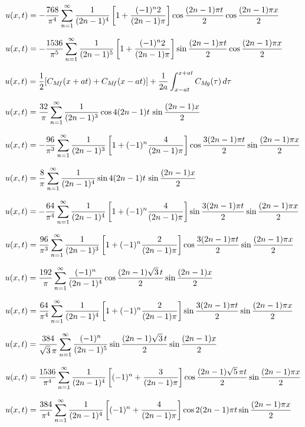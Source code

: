 $u(x,t)=-\displaystyle\frac{768}{\pi^{4}}\sum_{n=1}^{\infty}\frac{1}{(2n-1)^{4}}\left[
1+\frac{(-1)^{n}2}{(2n-1)\pi}\right]\cos\frac{(2n-1)\pi t}{2}\cos\frac{(2n-1)\pi
x}{2}$

$u(x,t)=-\displaystyle\frac{1536}{\pi^{5}}\sum_{n=1}^{\infty}\frac{1}{(2n-1)^{5}}\left[
1+\frac{(-1)^{n}2}{(2n-1)\pi}\right]\sin\frac{(2n-1)\pi t}{2}\cos\frac{(2n-1)\pi
x}{2}$

$u(x,t)=\displaystyle\frac{1}{2}[C_{M\!f}(x+at)+C_{M\!f}(x-at)]+
\frac{1}{2a}\int_{x-at}^{x+at}C_{M\!g}(\tau)\,d\tau$

$u(x,t)=\displaystyle
\frac{32}{\pi}\sum_{n=1}^{\infty}\frac{1}{(2n-1)^{3}}\cos4(2n-1)t\,\sin\frac{(2n-1)x}{2}$

$u(x,t)
=\displaystyle-\frac{96}{\pi^{3}}\sum_{n=1}^{\infty}
\frac{1}{(2n-1)^{3}}\left[1+(-1)^{n}\frac{4}{(2n-1)\pi}\right]
\cos\frac{3(2n-1)\pi t}{2}\sin\frac{(2n-1)\pi x}{2}$

$u(x,t)=\displaystyle
\frac{8}{\pi}\sum_{n=1}^{\infty}\frac{1}{(2n-1)^{4}}\sin4(2n-1)t\,\sin\frac{(2n-1)x}{2}$

$u(x,t)
=\displaystyle-\frac{64}{\pi^{4}}\sum_{n=1}^{\infty}
\frac{1}{(2n-1)^{4}}\left[1+(-1)^{n}\frac{4}{(2n-1)\pi}\right]
\sin\frac{3(2n-1)\pi t}{2}\sin\frac{(2n-1)\pi x}{2}$

$u(x,t)
=\displaystyle\frac{96}{\pi^{3}}\sum_{n=1}^{\infty}
\frac{1}{(2n-1)^{3}}\left[1+(-1)^{n}\frac{2}{(2n-1)\pi}\right]
\cos\frac{3(2n-1)\pi t}{2}
\sin\frac{(2n-1)\pi x}{2}$

$u(x,t)=\displaystyle\frac{192}{\pi}\sum_{n=1}^{\infty}\frac{(-1)^{n}}{(2n-1)^{4}}
\cos\frac{(2n-1)\sqrt{3}\,t}{2}\sin\frac{(2n-1)x}{2}$

$u(x,t)
=\displaystyle\frac{64}{\pi^{4}}\sum_{n=1}^{\infty}
\frac{1}{(2n-1)^{4}}\left[1+(-1)^{n}\frac{2}{(2n-1)\pi}\right]
\sin\frac{3(2n-1)\pi t}{2}
\sin\frac{(2n-1)\pi x}{2}$

$u(x,t)=\displaystyle\frac{384}{\sqrt{3}\,\pi}\sum_{n=1}^{\infty}\frac{(-1)^{n}}{(2n-1)^{5}}
\sin\frac{(2n-1)\sqrt{3}\,t}{2}\sin\frac{(2n-1)x}{2}$

$u(x,t)=\displaystyle\frac{1536}{\pi^{4}}\sum_{n=1}^{\infty}\frac{1}{(2n-1)^{4}}
\left[(-1)^{n}+\frac{3}{(2n-1)\pi}\right]
\cos\frac{(2n-1)\sqrt{5}\,\pi t}{2}\sin\frac{(2n-1)\pi x}{2}$

$u(x,t)=\displaystyle\frac{384}{\pi^{4}}\sum_{n=1}^{\infty}\frac{1}{(2n-1)^{4}}
\left[(-1)^{n}+\frac{4}{(2n-1)\pi}\right]\cos2(2n-1)\pi
t\sin\frac{(2n-1)\pi x}{2}$

